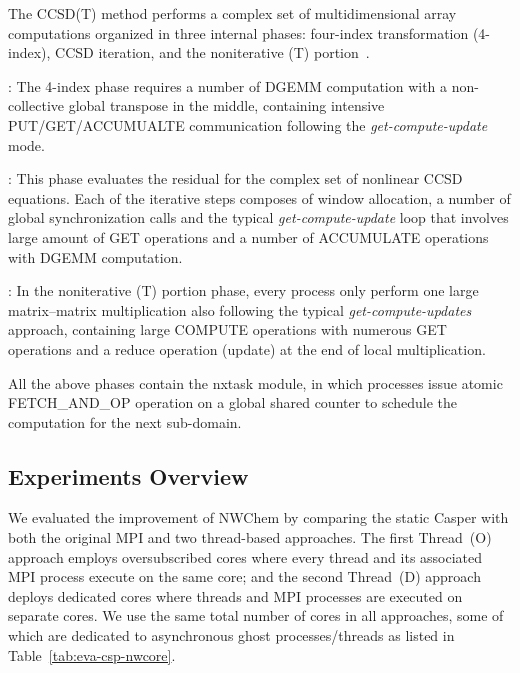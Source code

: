 The CCSD(T) method performs a complex set of multidimensional
array computations organized in three internal phases: four-index
transformation (4-index), CCSD iteration, and the noniterative (T)
portion~\cite{CPE:CPE1881}.

:
The 4-index phase requires a number of DGEMM computation with a
non-collective global transpose in the middle, containing intensive
PUT/GET/ACCUMUALTE communication following the {\em get-compute-update}
mode.

:
This phase evaluates the residual for the complex set of
nonlinear CCSD equations. Each of the iterative steps composes of window
allocation, a number of global synchronization calls and the typical
{\em get-compute-update} loop that involves large amount of
GET operations and a number of ACCUMULATE operations with DGEMM
computation.

:
In the noniterative (T) portion phase, every process only perform
one large matrix--matrix multiplication also following the typical
{\em get-compute-updates} approach, containing large COMPUTE operations
with numerous GET operations and a reduce operation (update) at
the end of local multiplication.

All the above phases contain the nxtask module, in which processes
issue atomic FETCH\_AND\_OP operation on a global shared counter to
schedule the computation for the next sub-domain.


\subsection{Experiments Overview}

We evaluated the improvement of NWChem by comparing the static Casper
with both the original MPI and two thread-based approaches. The first
Thread~(O) approach employs oversubscribed cores where every thread and
its associated MPI process execute on the same core; and the second
Thread~(D) approach deploys dedicated cores where threads and MPI
processes are executed on separate cores. We use the same total number
of cores in all approaches, some of which are dedicated to asynchronous
ghost processes\slash threads as listed in Table~\ref{tab:eva-csp-nwcore}.


